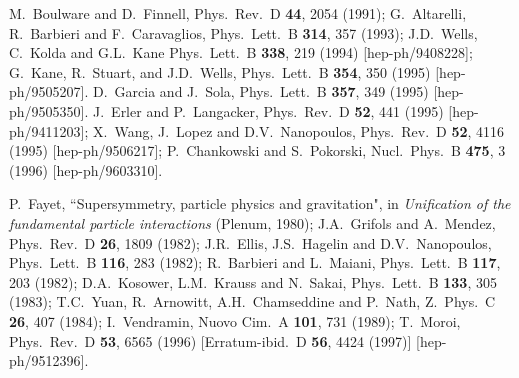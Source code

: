 \documentclass[11pt]{article}
\begin{document}
\begin{thebibliography}{999}
M.~Boulware and D.~Finnell, 
  Phys.\ Rev.\ D {\bf 44}, 2054 (1991);
G.~Altarelli, R.~Barbieri and F.~Caravaglios,
  Phys.\ Lett.\ B {\bf 314}, 357 (1993);
J.D.~Wells, C.~Kolda and G.L.~Kane 
  Phys.\ Lett.\ B {\bf 338}, 219 (1994)
  [hep-ph/9408228];
G.~Kane, R.~Stuart, and J.D.~Wells, 
  Phys.\ Lett.\ B {\bf 354}, 350 (1995)
  [hep-ph/9505207].
D.~Garcia and J.~Sola, 
  Phys.\ Lett.\ B {\bf 357}, 349 (1995)
  [hep-ph/9505350].
J.~Erler and P.~Langacker, 
  Phys.\ Rev.\ D {\bf 52}, 441 (1995)
  [hep-ph/9411203];
X.~Wang, J.~Lopez and D.V.~Nanopoulos,
  Phys.\ Rev.\ D {\bf 52}, 4116 (1995)
  [hep-ph/9506217];
P.~Chankowski and S.~Pokorski, 
  Nucl.\ Phys.\ B {\bf 475}, 3 (1996)
  [hep-ph/9603310].
  
P.~Fayet, ``Supersymmetry, particle physics and gravitation", 
  in {\em Unification of the fundamental
  particle interactions} (Plenum, 1980);
J.A.~Grifols and A.~Mendez,
  Phys.\ Rev.\ D {\bf 26}, 1809 (1982);
J.R.~Ellis, J.S.~Hagelin and D.V.~Nanopoulos,
  Phys.\ Lett.\ B {\bf 116}, 283 (1982);
R.~Barbieri and L.~Maiani,
  Phys.\ Lett.\ B {\bf 117}, 203 (1982);
D.A.~Kosower, L.M.~Krauss and N.~Sakai,
  Phys.\ Lett.\ B {\bf 133}, 305 (1983);
T.C.~Yuan, R.~Arnowitt, A.H.~Chamseddine and P.~Nath,
  Z.\ Phys.\ C {\bf 26}, 407 (1984);
I.~Vendramin,
  Nuovo Cim.\ A {\bf 101}, 731 (1989);
T.~Moroi,
  Phys.\ Rev.\ D {\bf 53}, 6565 (1996)
  [Erratum-ibid.\ D {\bf 56}, 4424 (1997)]
  [hep-ph/9512396].


\end{thebibliography}
\end{document}
